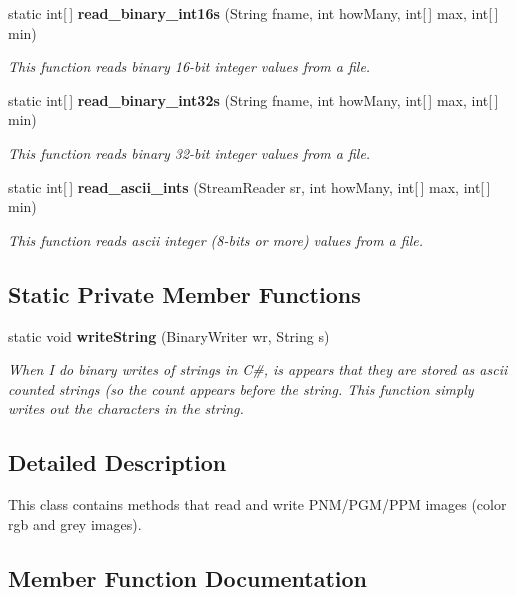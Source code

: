 \begin{CompactItemize}
static int[$\,$] {\bf read\_\-binary\_\-int16s} (String fname, int how\-Many, int[$\,$] max, int[$\,$] min)
\begin{CompactList}\small\item\em This function reads binary 16-bit integer values from a file. \item\end{CompactList}\item 
static int[$\,$] {\bf read\_\-binary\_\-int32s} (String fname, int how\-Many, int[$\,$] max, int[$\,$] min)
\begin{CompactList}\small\item\em This function reads binary 32-bit integer values from a file. \item\end{CompactList}\item 
static int[$\,$] {\bf read\_\-ascii\_\-ints} (Stream\-Reader sr, int how\-Many, int[$\,$] max, int[$\,$] min)
\begin{CompactList}\small\item\em This function reads ascii integer (8-bits or more) values from a file. \item\end{CompactList}\end{CompactItemize}
\subsection*{Static Private Member Functions}
\begin{CompactItemize}
\item 
static void {\bf write\-String} (Binary\-Writer wr, String s)
\begin{CompactList}\small\item\em When I do binary writes of strings in C\#, is appears that they are stored as ascii counted strings (so the count appears before the string. This function simply writes out the characters in the string. \item\end{CompactList}\end{CompactItemize}


\subsection{Detailed Description}
This class contains methods that read and write PNM/PGM/PPM images (color rgb and grey images). 



\subsection{Member Function Documentation}
